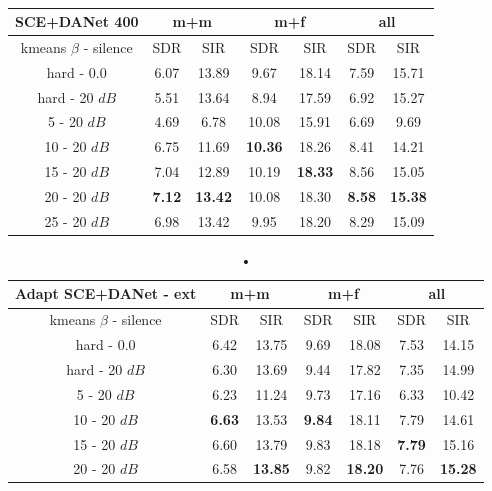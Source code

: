 \documentclass[master, tikz, final,11pt, dvipdfmx]{iscs-thesis}
\begin{document}
\begin{table}[h]
\centering
\begin{tabular}{c|c|c|c|c|c|c}
SCE+DANet 400 & \multicolumn{2}{c|}{m+m} & \multicolumn{2}{c|}{m+f} & \multicolumn{2}{c}{all} \\ 
\hline 
kmeans $\beta$ - silence & SDR & SIR & SDR & SIR & SDR & SIR \\ 
\hline
hard - 0.0  & 6.07 & 13.89 & 9.67 & 18.14 & 7.59 & 15.71 \\ 
hard - 20 $dB$  & 5.51 & 13.64 & 8.94 & 17.59 & 6.92 & 15.27 \\
\hline
\hline
5 - 20 $dB$  & 4.69 & 6.78 & 10.08 & 15.91 & 6.69 & 9.69 \\ 
10 - 20 $dB$  & 6.75 & 11.69 & \cellcolor{green}\textbf{10.36} & \cellcolor{green}18.26  & 8.41 & 14.21 \\ 
15 - 20 $dB$ & 7.04 & 12.89 & 10.19 & \textbf{18.33} & 8.56 & 15.05 \\ 
20 - 20 $dB$ & \cellcolor{green}\textbf{7.12} & \cellcolor{green}\textbf{13.42} & 10.08 & 18.30 & \cellcolor{green}\textbf{8.58} & \cellcolor{green}\textbf{15.38} \\ 
25 - 20 $dB$ & 6.98 & 13.42 & 9.95 & 18.20 & 8.29 & 15.09 \\ 
\end{tabular}
\captionsetup{justification=centering}
\caption{}
\label{table:SCEDANET400}
\end{table}

\begin{table}[h]
\centering
\begin{tabular}{c|c|c|c|c|c|c}
Adapt SCE+DANet - ext & \multicolumn{2}{c|}{m+m} & \multicolumn{2}{c|}{m+f} & \multicolumn{2}{c}{all} \\ 
\hline 
kmeans $\beta$ - silence & SDR & SIR & SDR & SIR & SDR & SIR \\ 
\hline
hard - 0.0  & 6.42 & 13.75 & 9.69 & 18.08 & 7.53 & 14.15 \\ 
hard - 20 $dB$  & 6.30 & 13.69 & 9.44 & 17.82 & 7.35 & 14.99 \\
\hline
\hline
5 - 20 $dB$  & 6.23 & 11.24 & 9.73 & 17.16 & 6.33 & 10.42 \\ 
10 - 20 $dB$  & \cellcolor{green}\textbf{6.63} & \cellcolor{green}13.53 & \cellcolor{green}\textbf{9.84} & \cellcolor{green}18.11 & 7.79 & 14.61 \\ 
15 - 20 $dB$ & 6.60 & 13.79 & 9.83 & 18.18 & \cellcolor{green}\textbf{7.79} & \cellcolor{green}15.16 \\ 
20 - 20 $dB$ & 6.58 & \textbf{13.85} & 9.82 & \textbf{18.20} & 7.76 & \textbf{15.28} \\ 
\end{tabular}
\caption{•}
\label{table:AdaptSCEDANET400}
\end{table}
\end{document}
